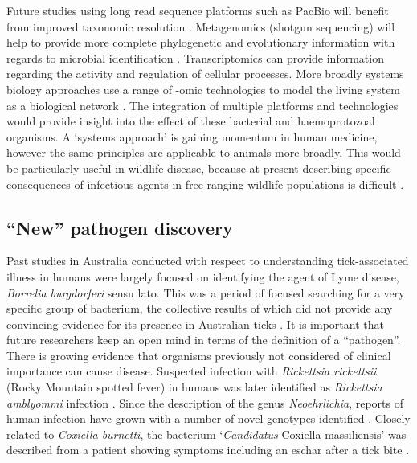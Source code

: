 \documentclass[a4paper, nobind]{templates/ociamthesis}
\begin{document}
Future studies using long read sequence platforms such as PacBio will benefit from improved taxonomic resolution \autocite{jamyLongReadMetabarcoding2020}.
Metagenomics (shotgun sequencing) will help to provide more complete phylogenetic and evolutionary information with regards to microbial identification \autocite{razzautiComparisonTranscriptomeSequencing2015}.
Transcriptomics can provide information regarding the activity and regulation of cellular processes.
More broadly systems biology approaches use a range of -omic technologies to model the living system as a biological network \autocite{eckhardtSystemsApproachInfectious2020}.
The integration of multiple platforms and technologies would provide insight into the effect of these bacterial and haemoprotozoal organisms.
A `systems approach' is gaining momentum in human medicine, however the same principles are applicable to animals more broadly.
This would be particularly useful in wildlife disease, because at present describing specific consequences of infectious agents in free-ranging wildlife populations is difficult \autocite{austenInvestigationMorphologicalDiversity2015,goftonNovelEhrlichiaSpecies2018,northoverIncreasedTrypanosomaSpp2019}.

\hypertarget{new-pathogen-discovery}{%
\subsection{``New'' pathogen discovery}\label{new-pathogen-discovery}}

Past studies in Australia conducted with respect to understanding tick-associated illness in humans were largely focused on identifying the agent of Lyme disease, \emph{Borrelia burgdorferi} sensu lato.
This was a period of focused searching for a very specific group of bacterium, the collective results of which did not provide any convincing evidence for its presence in Australian ticks \autocite{chaladaThereLymelikeDisease2016}.
It is important that future researchers keep an open mind in terms of the definition of a ``pathogen''.
There is growing evidence that organisms previously not considered of clinical importance can cause disease.
Suspected infection with \emph{Rickettsia rickettsii} (Rocky Mountain spotted fever) in humans was later identified as \emph{Rickettsia amblyommi} infection \autocite{appersonTickBorneDiseasesNorth2008}.
Since the description of the genus \emph{Neoehrlichia}, reports of human infection have grown with a number of novel genotypes identified \autocite{wassCultivationCausativeAgent2019}.
Closely related to \emph{Coxiella burnetti}, the bacterium `\emph{Candidatus} Coxiella massiliensis' was described from a patient showing symptoms including an eschar after a tick bite \autocite{angelakisCandidatusCoxiellaMassiliensis2016}.
\end{document}
